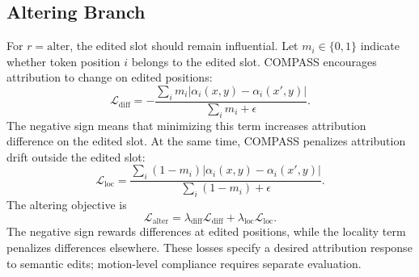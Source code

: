 \subsection{Altering Branch}
For $r=\mathrm{alter}$, the edited slot should remain influential. Let
$m_i\in\{0,1\}$ indicate whether token position $i$ belongs to the edited slot.
COMPASS encourages attribution to change on edited positions:
\begin{equation}
    \mathcal{L}_{\mathrm{diff}}
    =
    -
    \frac{\sum_i m_i|\alpha_i(x,y)-\alpha_i(x',y)|}
    {\sum_i m_i+\epsilon}.
\end{equation}
The negative sign means that minimizing this term increases attribution
difference on the edited slot. At the same time, COMPASS penalizes attribution
drift outside the edited slot:
\begin{equation}
    \mathcal{L}_{\mathrm{loc}}
    =
    \frac{\sum_i (1-m_i)|\alpha_i(x,y)-\alpha_i(x',y)|}
    {\sum_i (1-m_i)+\epsilon}.
\end{equation}
The altering objective is
\begin{equation}
    \mathcal{L}_{\mathrm{alter}}
    =
    \lambda_{\mathrm{diff}}\mathcal{L}_{\mathrm{diff}}
    +
    \lambda_{\mathrm{loc}}\mathcal{L}_{\mathrm{loc}} .
\end{equation}
The negative sign rewards differences at edited positions, while the locality
term penalizes differences elsewhere. These losses specify a desired
attribution response to semantic edits; motion-level compliance requires
separate evaluation.

